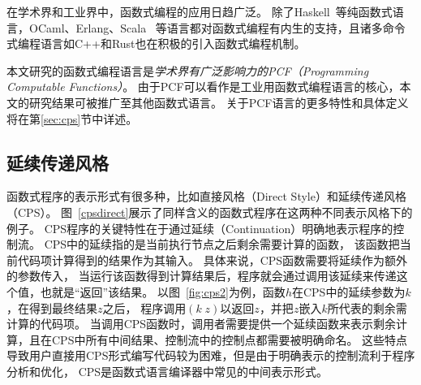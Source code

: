 在学术界和工业界中，函数式编程的应用日趋广泛。
除了Haskell~\cite{o2008real}等纯函数式语言，OCaml、Erlang、Scala~\cite{cesarini2009erlang, odersky2014unifying}
等语言都对函数式编程有内生的支持，且诸多命令式编程语言如C++和Rust也在积极的引入函数式编程机制。

本文研究的函数式编程语言是\textit{学术界有广泛影响力的PCF（Programming Computable Functions）}。
由于PCF可以看作是工业用函数式编程语言的核心，本文的研究结果可被推广至其他函数式语言。
关于PCF语言的更多特性和具体定义将在第\ref{sec:cps}节中详述。

\subsection{延续传递风格} \label{sec:bg_cps}

函数式程序的表示形式有很多种，比如直接风格（Direct Style）和延续传递风格（CPS）。
图~\ref{cpsdirect}展示了同样含义的函数式程序在这两种不同表示风格下的例子。
CPS程序的关键特性在于通过延续（Continuation）明确地表示程序的控制流。
CPS中的延续指的是当前执行节点之后剩余需要计算的函数，
该函数把当前代码项计算得到的结果作为其输入。
具体来说，CPS函数需要将延续作为额外的参数传入，
当运行该函数得到计算结果后，程序就会通过调用该延续来传递这个值，也就是``返回''该结果。
以图~\ref{fig:cps2}为例，函数$h$在CPS中的延续参数为$k$，在得到最终结果$z$之后，
程序调用$(k\; z)$以返回$z$，并把$z$嵌入$k$所代表的剩余需计算的代码项。
当调用CPS函数时，调用者需要提供一个延续函数来表示剩余计算，且在CPS中所有中间结果、控制流中的控制点都需要被明确命名。
这些特点导致用户直接用CPS形式编写代码较为困难，但是由于明确表示的控制流利于程序分析和优化，
CPS是函数式语言编译器中常见的中间表示形式。


